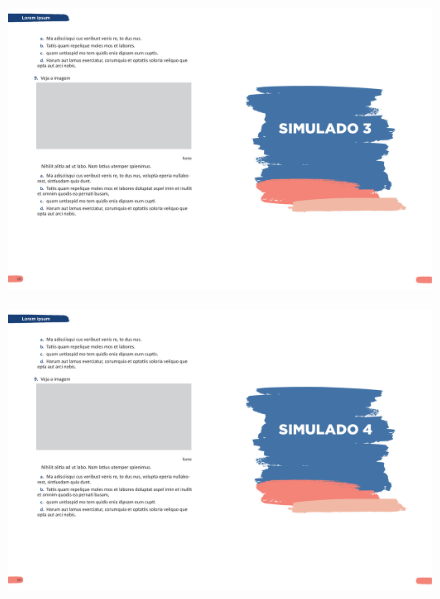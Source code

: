 \begin{figure}[htpb!]
\vspace*{-3cm}
\hspace*{-2.5cm}\includegraphics[scale=1]{../watermarks/3simulado5ano.pdf}
\end{figure}


\begin{figure}[htpb!]
\vspace*{-3cm}
\hspace*{-2.5cm}\includegraphics[scale=1]{../watermarks/4simulado5ano.pdf}
\end{figure}


%

\blankpage

